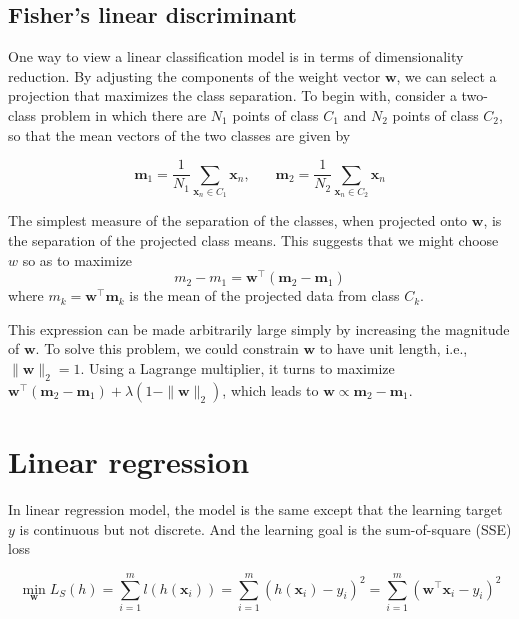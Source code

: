 \documentclass{article}
\begin{document}
	\subsection{Fisher's linear discriminant}
	
	One way to view a linear classification model is in terms of dimensionality reduction. By adjusting the components of the weight vector $\mathbf{w}$, we can select a projection that maximizes the class separation. To begin with, consider a two-class problem in which there are $N_1$ points of class $C_1$ and $N_2$ points of class $C_2$, so that the mean vectors of the two classes are given by

	\begin{equation}
	\mathbf{m}_1 = \frac{1}{N_1} \sum_{\mathbf{x}_n \in C_1} \mathbf{x}_n,\ \ \ \ \ \ \ \ 
	\mathbf{m}_2 = \frac{1}{N_2} \sum_{\mathbf{x}_n \in C_2} \mathbf{x}_n
	\end{equation}
	
	The simplest measure of the separation of the classes, when projected onto $\mathbf{w}$, is the separation of the projected class means. This suggests that we might choose $w$ so as to maximize 
	\begin{equation}
	m_2- m_1=\mathbf{w}^\top (\mathbf{m}_2-\mathbf{m}_1)
	\end{equation}
where $m_k=\mathbf{w}^\top \mathbf{m}_k$ is the mean of the projected data from class $C_k$. 

	This expression can be made arbitrarily large simply by increasing the magnitude of $\mathbf{w}$. To solve this problem, we could constrain $\mathbf{w}$ to have unit length, i.e., $\|\mathbf{w}\|_2=1$. Using a Lagrange multiplier, it turns to maximize $\mathbf{w}^\top (\mathbf{m}_2-\mathbf{m}_1) + \lambda (1-\|\mathbf{w}\|_2)$, which leads to $\mathbf{w}\propto \mathbf{m}_2-\mathbf{m}_1$.

\section{Linear regression}

	In linear regression model, the model is the same except that the learning target $y$ is continuous but not discrete. And the learning goal is the sum-of-square (SSE) loss

	\begin{equation}
	\min_\mathbf{w} L_S(h) =\sum_{i=1}^m  l(h(\mathbf{x}_i)) = \sum_{i=1}^m (h(\mathbf{x}_i) - y_i)^2 = \sum_{i=1}^m (\mathbf{w}^\top\mathbf{x}_i - y_i)^2 
	\end{equation}
\end{document}
